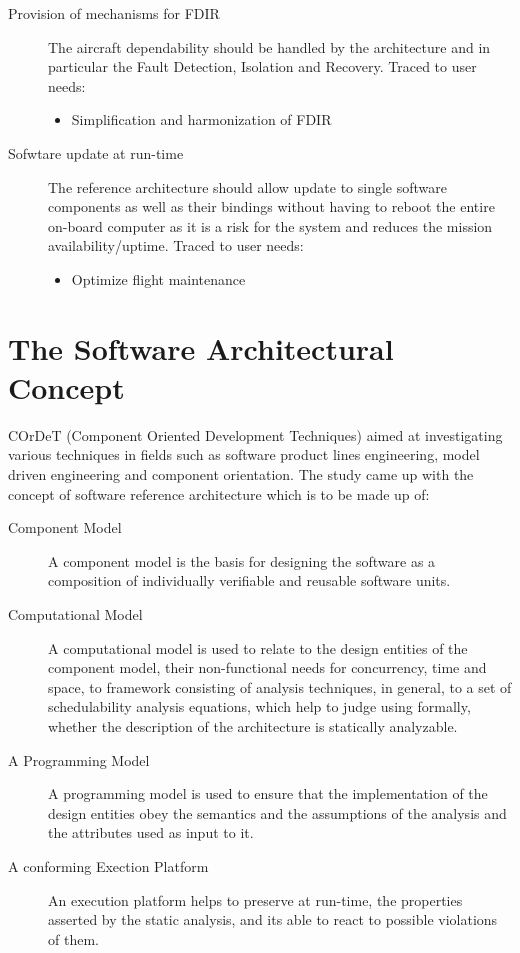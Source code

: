 \begin{description}
\item [Provision of mechanisms for FDIR] The aircraft dependability should be handled by the architecture and in particular the Fault Detection, Isolation and Recovery. Traced to user needs:
\begin{itemize}
\item Simplification and harmonization of FDIR  
\end{itemize}

\item [Sofwtare update at run-time] The reference architecture should allow update to single software components as well as their bindings without having to reboot the entire on-board computer as it is a risk for the system and reduces the mission availability/uptime. Traced to user needs:
\begin{itemize}
\item Optimize flight maintenance 
\end{itemize}
\end{description}

\section{The Software Architectural Concept}
COrDeT (Component Oriented Development Techniques) aimed at investigating various techniques in fields such as software product lines engineering, model driven engineering and component orientation. The study came up with the concept of software reference architecture which is to be made up of:

\begin{description}
\item [Component Model] A component model is the basis for designing the software as a composition of individually verifiable and reusable software units.

\item [Computational Model] A computational model is used to relate to the design entities of the component model, their non-functional needs for concurrency, time and space, to framework consisting of analysis techniques, in general, to a set of schedulability analysis equations, which help to judge using formally, whether the description of the architecture is statically analyzable.

\item [A Programming Model] A programming model is used to ensure that the implementation of the design entities obey the semantics and the assumptions of the analysis and the attributes used as input to it.

\item [A conforming Exection Platform] An execution platform helps to preserve at run-time, the properties asserted by the static analysis, and its able to react to possible violations of them.  
\end{description}

